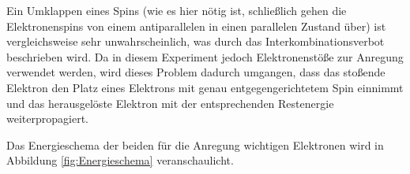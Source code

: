 Ein Umklappen eines Spins (wie es hier nötig ist, schließlich gehen die Elektronenspins von einem antiparallelen in einen 
parallelen Zustand über) ist vergleichsweise sehr unwahrscheinlich, was durch das Interkombinationsverbot beschrieben wird. 
Da in diesem Experiment jedoch Elektronenstöße zur Anregung verwendet werden, wird dieses Problem dadurch umgangen, dass 
das stoßende Elektron den Platz eines Elektrons mit genau entgegengerichtetem Spin einnimmt und das herausgelöste Elektron mit 
der entsprechenden Restenergie weiterpropagiert. 

Das Energieschema der beiden für die Anregung wichtigen Elektronen wird in Abbildung \ref{fig:Energieschema} veranschaulicht\cite{Versuchsanleitung}. 
